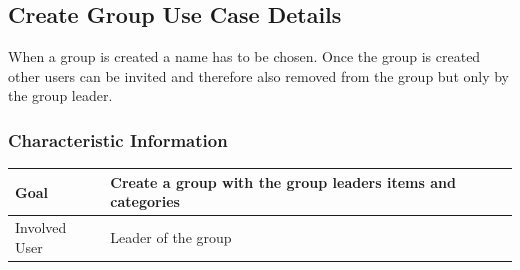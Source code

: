 \documentclass[12pt]{article}
\theoremstyle{definition}
\begin{document}
\subsection{Create Group Use Case Details}

When a group is created a name has to be chosen. Once the group is created other users can be invited and therefore also removed from the group but only by the group leader.

\subsubsection{Characteristic Information}

\begin{tabular}{|l|l|}
\hline
Goal &  Create a group with the group leaders items and categories\\ \hline
Involved User & Leader of the group \\ \hline
\end{tabular}
\end{document}
